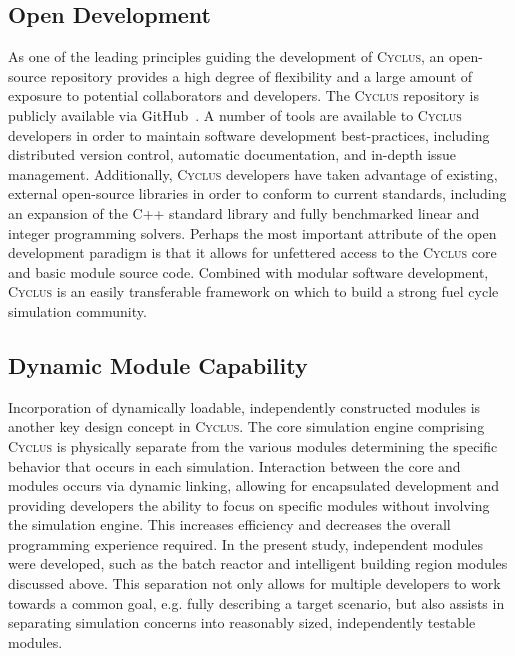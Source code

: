 \documentclass{anstrans}
\begin{document}
\subsection{Open Development}
As one of the leading principles guiding the development of
\textsc{Cyclus}, an open-source repository provides a high degree of
flexibility and a large amount of exposure to potential collaborators
and developers. The \textsc{Cyclus} repository is publicly available via
GitHub~\cite{cyclus2012}. A number of tools are available to
\textsc{Cyclus} developers in order to maintain software development
best-practices, including distributed version control, automatic
documentation, and in-depth issue management. Additionally,
\textsc{Cyclus} developers have taken advantage of existing, external
open-source libraries in order to conform to current standards,
including an expansion of the C++ standard library and fully
benchmarked linear and integer programming solvers. Perhaps the most
important attribute of the open development paradigm is that it allows
for unfettered access to the \textsc{Cyclus} core and basic module
source code. Combined with modular software development, \textsc{Cyclus}
is an easily transferable framework on which to build a strong fuel
cycle simulation community.

\subsection{Dynamic Module Capability}
Incorporation of dynamically loadable, independently constructed
modules is another key design concept in \textsc{Cyclus}. The core
simulation engine comprising \textsc{Cyclus} is physically separate from
the various modules determining the specific behavior that occurs in
each simulation.  Interaction between the core and modules occurs via
dynamic linking, allowing for encapsulated development and providing
developers the ability to focus on specific modules without involving
the simulation engine. This increases efficiency and decreases the
overall programming experience required. In the present study,
independent modules were developed, such as the batch reactor and
intelligent building region modules discussed above. This separation
not only allows for multiple developers to work towards a common goal,
e.g. fully describing a target scenario, but also assists in
separating simulation concerns into reasonably sized, independently
testable modules.

\end{document}
